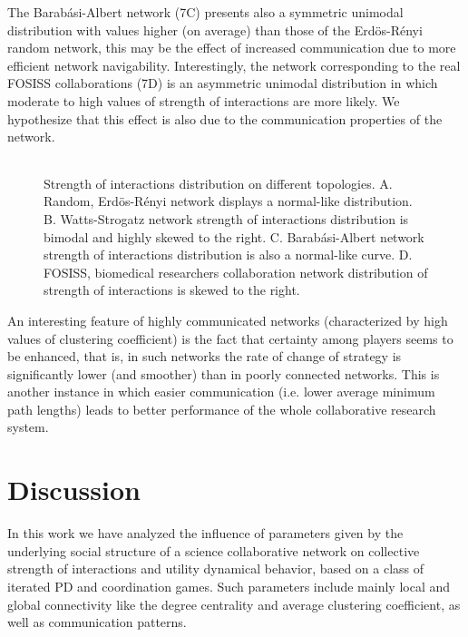 \documentclass{bmcart}
\def\texttt{[image: ]}
\begin{document}
The Barab\'asi-Albert network (7C) presents also a symmetric unimodal
distribution with values higher (on average) than those of the Erd\"{o}s-R\'enyi
random network, this may be the effect of increased communication due to more
efficient network navigability. Interestingly, the network corresponding to the
real FOSISS collaborations (7D) is an asymmetric unimodal distribution in which
moderate to high values of strength of interactions are more likely. We 
hypothesize that this effect is also due to the communication properties of the
network. \\

\begin{figure} [h!]
\centering
\begin{tabular}{cc}

\end{tabular}
\caption{Strength of interactions distribution on different topologies. A. Random, Erd\"{o}s-R\'enyi network displays a normal-like
distribution. B. Watts-Strogatz network strength of interactions distribution is bimodal and highly skewed to the right. C.
Barab\'asi-Albert network strength of interactions distribution is also a
normal-like curve. D. FOSISS, biomedical researchers collaboration network distribution of strength of interactions is skewed to the right.}\label{histo_trust}  
\end{figure}


An interesting feature of highly communicated networks (characterized
by high values of clustering coefficient) is the fact that certainty
among players seems to be enhanced, that is, in such networks the rate
of change of strategy is significantly lower (and smoother) than in
poorly connected networks. This is another instance in which easier
communication (i.e. lower average minimum path lengths) leads to better
performance of the whole collaborative research system.\\

\section*{Discussion}
\label{sec:3}

In this work we have analyzed the influence of parameters
  given by the underlying social structure of a science collaborative
  network on collective strength of interactions and utility dynamical
  behavior, based on a class of iterated PD and coordination
  games. Such parameters include mainly local and global connectivity
  like the degree centrality and average clustering coefficient, as
  well as communication patterns.\\
\end{document}
